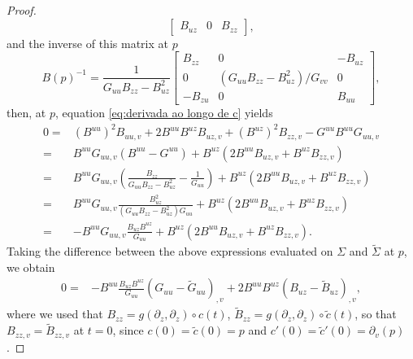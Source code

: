 \documentclass[11pt,reqno]{amsart}
\begin{document}
\begin{proof}
\begin{equation*}
\begin{bmatrix}
            B_{uz} & 0 & B_{zz}
        \end{bmatrix},
\end{equation*}
and the inverse of this matrix at $p$ 
\begin{equation*}
    B(p)^{-1}=\frac{1}{G_{uu}B_{zz}-B_{uz}^2}\begin{bmatrix}
            B_{zz} & 0 & -B_{uz} \\
            0 & (G_{uu}B_{zz}-B_{uz}^2)/G_{vv} & 0 \\
            -B_{zu} & 0 & B_{uu}
        \end{bmatrix},
\end{equation*}
then, at $p$, equation \eqref{eq:derivada ao longo de c} yields
\begin{align*}
    0 = & (B^{uu})^2B_{uu,v}+2B^{uu}B^{uz}B_{uz,v}+(B^{uz})^2B_{zz,v}-G^{uu}B^{uu}G_{uu,v} \\
    = & B^{uu}G_{uu,v}(B^{uu}-G^{uu})+B^{uz}(2B^{uu}B_{uz,v}+B^{uz}B_{zz,v}) \\
    = & B^{uu}G_{uu,v}\left(\frac{B_{zz}}{G_{uu}B_{zz}-B_{uz}^2}-\frac{1}{G_{uu}}\right)+B^{uz}(2B^{uu}B_{uz,v}+B^{uz}B_{zz,v}) \\
    = & B^{uu}G_{uu,v}\frac{B_{uz}^2}{(G_{uu}B_{zz}-B_{uz}^2)G_{uu}}+B^{uz}(2B^{uu}B_{uz,v}+B^{uz}B_{zz,v}) \\
    = & -B^{uu}G_{uu,v}\frac{B_{uz}B^{uz}}{G_{uu}}+B^{uz}(2B^{uu}B_{uz,v}+B^{uz}B_{zz,v}).
\end{align*}
Taking the difference between the above expressions evaluated on $\Sigma$ and $\widetilde{\Sigma}$ at $p$, we obtain
\begin{align}\label{eq:auxiliar}
    0%
    = & -B^{uu}\frac{B_{uz}B^{uz}}{G_{uu}}(G_{uu}-\widetilde{G}_{uu})_{,v} + 2B^{uu}B^{uz}(B_{uz}-\widetilde{B}_{uz})_{,v},
\end{align}
where we used that $B_{zz}=g(\partial_z,\partial_z)\circ c(t)$, $\widetilde{B}_{zz}=g(\partial_z,\partial_z)\circ \widetilde{c}(t)$, so that $B_{zz,v}=\widetilde{B}_{zz,v}$ at $t=0$, since $c(0)=\widetilde{c}(0)=p$ and $c'(0)=\widetilde{c}'(0)=\partial_v(p)$. 


\end{proof}
\end{document}
